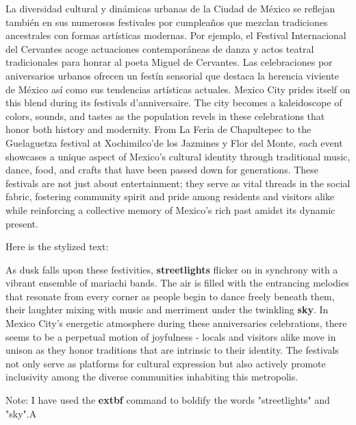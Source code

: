 \documentclass[12pt, a4paper]{article}
\begin{document}
La diversidad cultural y dinámicas urbanas de la Ciudad de México se reflejan también en sus numerosos festivales por cumpleaños que mezclan tradiciones ancestrales con formas artísticas modernas. Por ejemplo, el Festival Internacional del Cervantes acoge actuaciones contemporáneas de danza y actos teatral tradicionales para honrar al poeta Miguel de Cervantes. Las celebraciones por aniversarios urbanos ofrecen un festín sensorial que destaca la herencia viviente de México así como sus tendencias artísticas actuales.
Mexico City prides itself on this blend during its festivals d’anniversaire. The city becomes a kaleidoscope of colors, sounds, and tastes as the population revels in these celebrations that honor both history and modernity. From La Feria de Chapultepec to the Guelaguetza festival at Xochimilco'de los Jazmines y Flor del Monte, each event showcases a unique aspect of Mexico’s cultural identity through traditional music, dance, food, and crafts that have been passed down for generations. These festivals are not just about entertainment; they serve as vital threads in the social fabric, fostering community spirit and pride among residents and visitors alike while reinforcing a collective memory of Mexico’s rich past amidst its dynamic present.

Here is the stylized text:

As dusk falls upon these festivities, \textbf{streetlights} flicker on in synchrony with a vibrant ensemble of mariachi bands. The air is filled with the entrancing melodies that resonate from every corner as people begin to dance freely beneath them, their laughter mixing with music and merriment under the twinkling \textbf{sky}. In Mexico City's energetic atmosphere during these anniversaries celebrations, there seems to be a perpetual motion of joyfulness - locals and visitors alike move in unison as they honor traditions that are intrinsic to their identity. The festivals not only serve as platforms for cultural expression but also actively promote inclusivity among the diverse communities inhabiting this metropolis.

Note: I have used the \textbf{extbf} command to boldify the words "streetlights" and "sky".A
\end{document}
